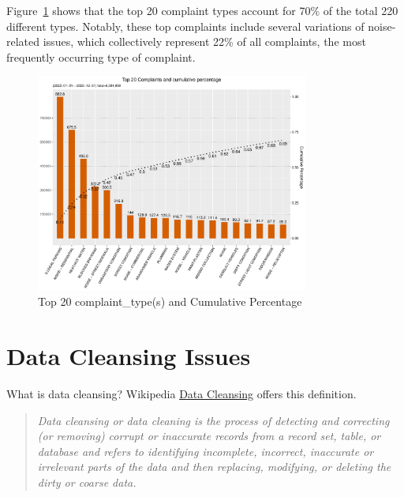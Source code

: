 \documentclass[12pt, titlepage]{article}
\begin{document}
Figure~\ref{fig:SR_complaints} shows that the top 20 complaint 
types account for 70\% of the total 220 different types. Notably, 
these top complaints include several variations of noise-related 
issues, which collectively represent 22\% of all complaints, the 
most frequently occurring type of complaint.

\begin{figure}[tbp]
 \centering
  \includegraphics[width=0.8\textwidth]{SR_by_Complaint_Type.pdf} 
  \caption{Top 20 complaint\_type(s) and Cumulative Percentage} 
  \label{fig:SR_complaints}
\end{figure}


\section{Data Cleansing Issues} 
\label{sec:issues}
What is data cleansing?  Wikipedia 
\href{https://en.wikipedia.org/wiki/Data_cleansing}{Data Cleansing} 
offers this definition. 

\begin{quote}\textit{Data cleansing or data cleaning is the process of detecting and 
correcting (or removing) corrupt or inaccurate records from a record set, 
table, or database and refers to identifying incomplete, incorrect, 
inaccurate or irrelevant parts of the data and then replacing, 
modifying, or deleting the dirty or coarse data.}
\end{quote}
\end{document}

